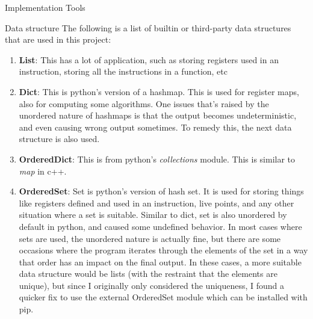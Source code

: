\documentclass[letterpaper,12pt]{article}
\theoremstyle{definition}
\begin{document}
\begin{section}{Implementation Tools}
\begin{subsection}{Data structure}
            The following is a list of builtin or third-party data structures that are used in this project:
            \begin{enumerate}
                \item \textbf{List}: This has a lot of application, such as storing registers used in an instruction, storing all the instructions in a function, etc
                \item \textbf{Dict}: This is python's version of a hashmap. This is used for register maps, also for computing some algorithms. One issues that's raised by the unordered nature of hashmaps is that the output becomes undeterministic, and even causing wrong output sometimes. To remedy this, the next data structure is also used.
                \item \textbf{OrderedDict}: This is from python's \textit{collections} module. This is similar to \textit{map} in c++.
                \item \textbf{OrderedSet}: Set is python's version of hash set. It is used for storing things like registers defined and used in an instruction, live points, and any other situation where a set is suitable. Similar to dict, set is also unordered by default in python, and caused some undefined behavior. In most cases where sets are used, the unordered nature is actually fine, but there are some occasions where the program iterates through the elements of the set in a way that order has an impact on the final output. In these cases, a more suitable data structure would be lists (with the restraint that the elements are unique), but since I originally only considered the uniqueness, I found a quicker fix to use the external OrderedSet module which can be installed with pip.
            \end{enumerate}
        \end{subsection}
    \end{section}
\end{document}
